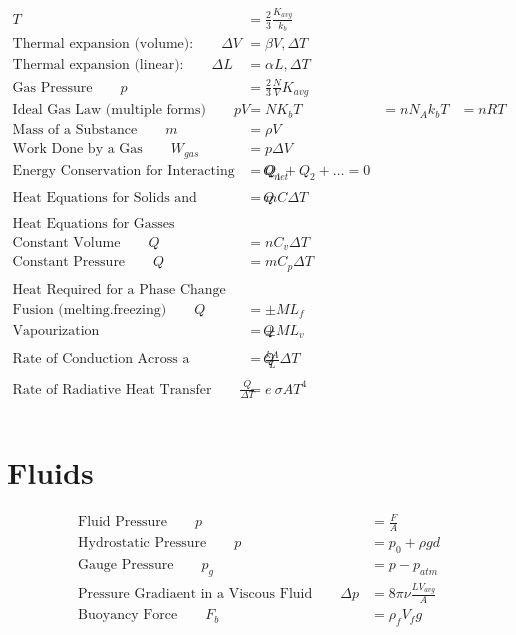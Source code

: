\documentclass[]{article}
\begin{document}
\begin{align*}
T &= \frac{2}{3} \frac{K_{avg}}{k_b} \\
\text{Thermal expansion (volume):} \qquad \Delta V &= \beta V, \Delta T \\
\text{Thermal expansion (linear):} \qquad \Delta L &= \alpha L, \Delta T \\
\text{Gas Pressure} \qquad p &= \frac{2}{3} \frac{N}{V} K_{avg} \\
\text{Ideal Gas Law (multiple forms)} \qquad p V &= N K_b T &= n N_A k_b T &= n R T  \\
\text{Mass of a Substance} \qquad  m &= \rho V \\
\text{Work Done by a Gas} \qquad W_{gas} &= p \Delta V \\
\text{Energy Conservation for Interacting Systems} \qquad Q_{net} &= Q_1 + Q_2 + \ldots = 0 \\
\\
\text{Heat Equations for Solids and Liquids} \qquad Q &= m C \Delta T \\
\\
\text{Heat Equations for Gasses}  \\
\text{Constant Volume} \qquad Q &= n C_v \Delta T \\
\text{Constant Pressure} \qquad Q &= m C _p\Delta T \\
\\
\text{Heat Required for a Phase Change}  \\
\text{Fusion (melting.freezing)} \qquad Q &= \pm M L_f \\
\text{Vapourization (boiling/conmdensing)} \qquad Q &= \pm M L_v \\
\\
\text{Rate of Conduction Across a Temperature Gradient} \qquad Q &= \frac{k A}{L} \Delta T \\
\\
\text{Rate of Radiative Heat Transfer} \qquad \frac{Q}{\Delta T} &= e \ \sigma A T^4 \\
\\
\end{align*} 

\newpage


\section{Fluids}

\begin{align*}
	\text{Fluid Pressure} \qquad p &= \frac{F}{A} \\
	\text{Hydrostatic Pressure} \qquad p &= p_0 + \rho g d \\
	\text{Gauge Pressure} \qquad p_g &= p - p_{atm} \\
	\text{Pressure Gradiaent in a Viscous Fluid} \qquad \Delta p &= 8 \pi \nu \frac{L V_{avg}}{A} \\
	\text{Buoyancy Force} \qquad F_b &= \rho_f V_f g \\
\end{align*}
	
\end{document}

